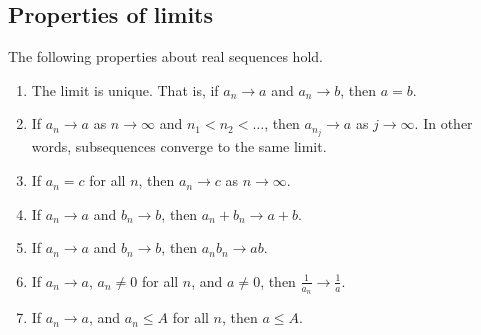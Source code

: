 \subsection{Properties of limits}
\begin{lemma}
	The following properties about real sequences hold.
	\begin{enumerate}
		\item The limit is unique.
		      That is, if \(a_n \to a\) and \(a_n \to b\), then \(a = b\).
		\item If \(a_n \to a\) as \(n \to \infty\) and \(n_1 < n_2 < \dots\), then \(a_{n_j} \to a\) as \(j \to \infty\).
		      In other words, subsequences converge to the same limit.
		\item If \(a_n = c\) for all \(n\), then \(a_n \to c\) as \(n \to \infty\).
		\item If \(a_n \to a\) and \(b_n \to b\), then \(a_n + b_n \to a + b\).
		\item If \(a_n \to a\) and \(b_n \to b\), then \(a_n b_n \to ab\).
		\item If \(a_n \to a\), \(a_n \neq 0\) for all \(n\), and \(a \neq 0\), then \(\frac{1}{a_n} \to \frac{1}{a}\).
		\item If \(a_n \to a\), and \(a_n \leq A\) for all \(n\), then \(a \leq A\).
	\end{enumerate}
\end{lemma}
